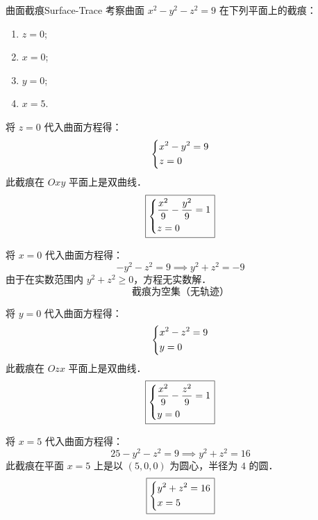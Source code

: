 \begin{problem}{曲面截痕}{Surface-Trace}
    考察曲面 $x^2 - y^2 - z^2 = 9$ 在下列平面上的截痕：
    \begin{enumerate}
        \item $z = 0$;
        \item $x = 0$;
        \item $y = 0$;
        \item $x = 5$.
    \end{enumerate}
\end{problem}

\begin{solution}
    将 $z = 0$ 代入曲面方程得：
    \begin{equation}
        \begin{dcases}
            x^2 - y^2 = 9 \\
            z = 0
        \end{dcases}
    \end{equation}
    此截痕在 $Oxy$ 平面上是双曲线．
    \begin{equation}
        \boxed{\begin{dcases} \dfrac{x^2}{9} - \dfrac{y^2}{9} = 1 \\ z = 0 \end{dcases}}
    \end{equation}

    将 $x = 0$ 代入曲面方程得：
    \begin{equation}
        -y^2 - z^2 = 9 \implies y^2 + z^2 = -9
    \end{equation}
    由于在实数范围内 $y^2 + z^2 \ge 0$，方程无实数解．
    \begin{equation}
        \boxed{\text{截痕为空集（无轨迹）}}
    \end{equation}

    将 $y = 0$ 代入曲面方程得：
    \begin{equation}
        \begin{dcases}
            x^2 - z^2 = 9 \\
            y = 0
        \end{dcases}
    \end{equation}
    此截痕在 $Ozx$ 平面上是双曲线．
    \begin{equation}
        \boxed{\begin{dcases} \dfrac{x^2}{9} - \dfrac{z^2}{9} = 1 \\ y = 0 \end{dcases}}
    \end{equation}

    将 $x = 5$ 代入曲面方程得：
    \begin{equation}
        25 - y^2 - z^2 = 9 \implies y^2 + z^2 = 16
    \end{equation}
    此截痕在平面 $x = 5$ 上是以 $(5, 0, 0)$ 为圆心，半径为 $4$ 的圆．
    \begin{equation}
        \boxed{\begin{dcases} y^2 + z^2 = 16 \\ x = 5 \end{dcases}}
    \end{equation}
\end{solution}
